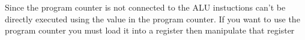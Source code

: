 \documentclass[letterpaper,12pt,titlepage]{article}
\begin{document}
\begin{mdframed}[style=MyFrame]
Since the program counter is not connected to the ALU instuctions can't be directly executed using the value in the program counter. If you want to use the program counter you must load it into a register then manipulate that register
\end{mdframed}



\end{document}

